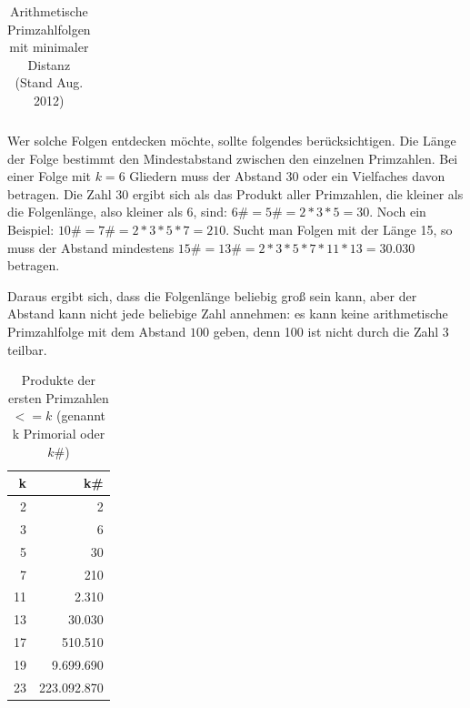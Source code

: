 \begin{refsegment}
\begin{itemize}
\begin{table}[ht]
\begin{center}
\begin{tabular}{|r|r|r|r|r|}
     \hline
     \end{tabular}
     \caption{Arithmetische Primzahlfolgen mit minimaler Distanz (Stand Aug. 2012)}
     \label{Smallest AP-k with minimal difference}
     \end{center}
     \end{table}

     Wer solche Folgen entdecken möchte, sollte folgendes berücksichtigen.
     Die Länge der Folge bestimmt den Mindestabstand zwischen den einzelnen
     Primzahlen. Bei einer Folge mit $k=6$ Gliedern muss der Abstand 30 oder ein
     Vielfaches davon betragen. Die Zahl 30 ergibt sich als das Produkt aller
     Primzahlen, die kleiner als die Folgenlänge, also kleiner als 6, sind:
     $ 6\# = 5\# = 2 * 3 * 5 = 30 $.
     Noch ein Beispiel: $ 10\# = 7\# = 2 * 3 * 5 * 7 = 210$.
     Sucht man Folgen mit der Länge 15, so muss der
     Abstand mindestens $ 15\# = 13\# = 2 * 3 * 5 * 7 * 11 * 13 = 30.030 $ betragen.
      

     Daraus ergibt sich, dass die Folgenlänge beliebig groß sein kann, aber
     der Abstand kann nicht jede beliebige Zahl annehmen: es kann keine
     arithmetische Primzahlfolge mit dem Abstand $100$ geben, denn 100 ist
     nicht durch die Zahl 3 teilbar.

     \begin{table}[ht]
     \begin{center}
     \hspace*{1cm}\begin{tabular}{|r|r|}
     \hline
      k &                k\# \\ \hline
      2 &                 2 \\
      3 &                 6 \\
      5 &                30 \\
      7 &               210 \\
     11 &             2.310 \\
     13 &            30.030 \\
     17 &           510.510 \\
     19 &         9.699.690 \\
     23 &       223.092.870 \\
      \hline
     \end{tabular}
     \caption{Produkte der ersten Primzahlen $<= k$ (genannt k Primorial oder $k\#$)}
     \end{center}
     \end{table}



\end{itemize}
\end{refsegment}
